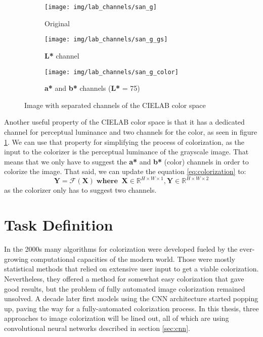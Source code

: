 \begin{figure}[!h]
	\centering
	\begin{subfigure}{.3\textwidth}
		\centering
		\texttt{[image: img/lab\_channels/san\_g]}
        \caption{Original}
	\end{subfigure}
	\begin{subfigure}{.3\textwidth}
		\centering
		\texttt{[image: img/lab\_channels/san\_g\_gs]}
        \caption{\textbf{L*} channel}
	\end{subfigure}
	\begin{subfigure}{.3\textwidth}
		\centering
		\texttt{[image: img/lab\_channels/san\_g\_color]}
        \caption{\textbf{a*} and \textbf{b*} channels (\textbf{L*} = 75)}
	\end{subfigure}
    \caption{Image with separated channels of the CIELAB color space}
	\label{fig:lab_channels}
\end{figure}

Another useful property of the CIELAB color space is that it has a dedicated channel
for perceptual luminance and two channels for the color, as seen in figure \ref{fig:lab_channels}. 
We can use that property for simplifying the process of colorization, as the input to the 
colorizer is the perceptual luminance of the grayscale image. That means that we only have to 
suggest the \textbf{a*} and \textbf{b*} (color) channels in order to colorize the image. 
That said, we can update the equation \ref{eq:colorization} to:
\begin{equation}
    \mathbf{Y} = \mathcal{F}(\mathbf{X})\;\mathbf{where}\;\;\mathbf{X} \in \mathbb{R}^{H \times W \times 1}, \mathbf{Y} \in \mathbb{R}^{H \times W \times 2}\label{eq:colorization_2}
\end{equation}    
as the colorizer only has to suggest two channels.

\section{Task Definition}
\label{sec:task}

In the 2000s many algorithms for colorization were developed \citep{levin2004colorization}\citep{luan2007colorization}\citep{charpiat2008colorization}\citep{reinhard2001colorization} 
fueled by the ever-growing computational capacities of the modern world. Those were mostly 
statistical methods that relied on extensive user input to get a viable colorization. 
Nevertheless, they offered a method for somewhat easy colorization that gave good results, 
but the problem of fully automated image colorization remained unsolved. A decade later 
first models \citep{cheng2015colorization}\citep{iizuka2016colorization} using the CNN
architecture started popping up, paving the way for a fully-automated colorization process.
In this thesis, three approaches to image colorization will be lined out, all of which are using 
convolutional neural networks described in section \ref{sec:cnn}.


